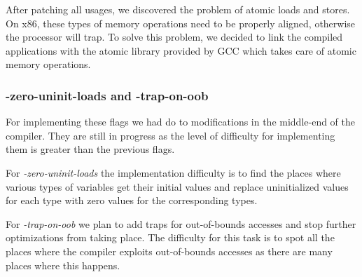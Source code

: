 After patching all usages, we discovered the problem of atomic loads and stores.
On x86, these types of memory operations need to be properly aligned, otherwise
the processor will trap. To solve this problem, we decided to link the compiled
applications with the atomic library provided by GCC which takes care of atomic
memory operations.

\subsubsection{-zero-uninit-loads and -trap-on-oob}

For implementing these flags we had do to modifications in the middle-end of the
compiler. They are still in progress as the level of difficulty for implementing
them is greater than the previous flags.

For \textit{-zero-uninit-loads} the implementation difficulty is to find the
places where various types of variables get their initial values and replace
uninitialized values for each type with zero values for the corresponding types.

For \textit{-trap-on-oob} we plan to add traps for out-of-bounds accesses and
stop further optimizations from taking place. The difficulty for this task is to
spot all the places where the compiler exploits out-of-bounds accesses as there
are many places where this happens.
